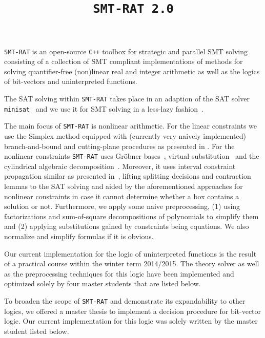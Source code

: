 \documentclass{article}
\title{\texttt{SMT-RAT 2.0}}
\begin{document}
\maketitle

\texttt{SMT-RAT} is an open-source \texttt{C++} toolbox for strategic and parallel SMT solving
consisting of a collection of SMT compliant implementations of methods for
solving quantifier-free (non)linear real and integer arithmetic as well as
the logics of bit-vectors and uninterpreted functions.

The SAT solving within \texttt{SMT-RAT} takes place in an adaption of the SAT solver \texttt{minisat}~\cite{minisat} and we use it for SMT solving in a less-lazy fashion~\cite{sebastiani2007lazy}.

The main focus of \texttt{SMT-RAT} is nonlinear arithmetic. For the linear constraints we use the Simplex method equipped with (currently very naively implemented) branch-and-bound and cutting-plane procedures as presented in \cite{DM06}. For the nonlinear constraints \texttt{SMT-RAT} uses Gr\"obner bases~\cite{JLCA_CAI13}, virtual substitution~\cite{Article_Corzilius_FCT2011} and the cylindrical algebraic decomposition~\cite{Article_Loup_TubeCAD}. Moreover, it uses interval constraint propagation similar as presented in~\cite{GGIGSC10}, lifting splitting decisions and contraction lemmas to the SAT solving and aided by the aforementioned approaches for nonlinear constraints in case it cannot determine whether a box contains a solution or not. Furthermore, we apply some naive preprocessing, (1) using factorizations and sum-of-square decompositions of polynomials to simplify them and (2) applying substitutions gained by constraints being equations. We also normalize and simplify formulas if it is obvious.

Our current implementation for the logic of uninterpreted functions is the
result of a practical course within the winter term 2014/2015. The theory
solver as well as the preprocessing techniques for this logic have been
implemented and optimized solely by four master students that are listed
below.

To broaden the scope of \texttt{SMT-RAT} and demonstrate its expandability to other
logics, we offered a master thesis to implement a decision procedure for
bit-vector logic. Our current implementation for this logic was solely
written by the master student listed below.
\end{document}
